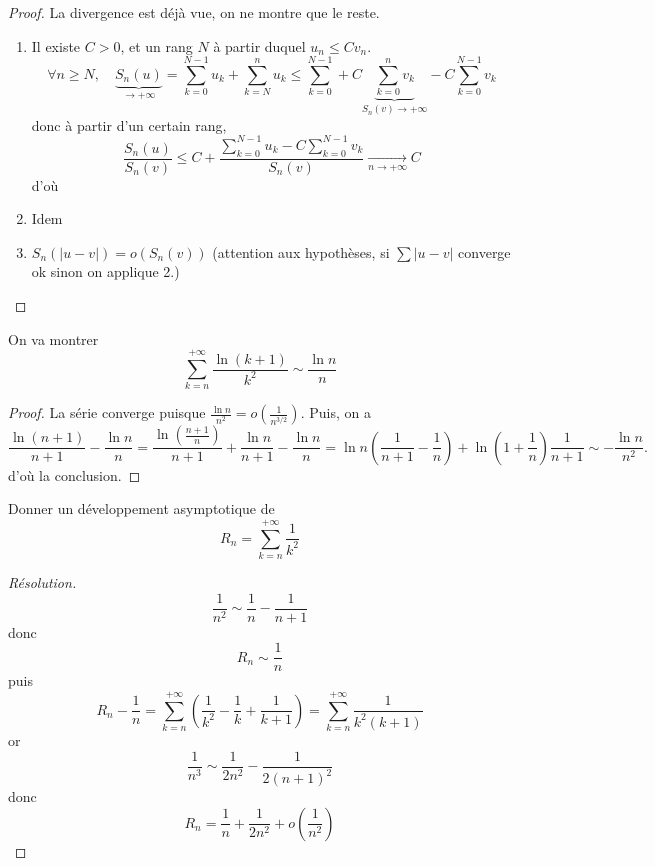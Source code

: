 \begin{proof}
    La divergence est déjà vue, on ne montre que le reste.
    \begin{enumerate}
        \item Il existe $C>0$, et un rang $N$ à partir duquel $u_n\leq Cv_n$. \[
                \forall n\geq N, \quad \underbrace{S_n(u)}_{\longrightarrow+\infty}=\sum_{k=0}^{N-1}u_k+\sum_{k=N}^nu_k\leq \sum_{k=0}^{N-1}+C\underbrace{\sum_{k=0}^nv_k}_{S_n(v)\longrightarrow+\infty}-C\sum_{k=0}^{N-1}v_k
            \]
            donc à partir d'un certain rang, \[
                \frac{S_n(u)}{S_n(v)}\leq C+\frac{\sum_{k=0}^{N-1}u_k-C\sum_{k=0}^{N-1}v_k}{S_n(v)}\xrightarrow[n\to+\infty]{}C
            \]
            d'où \conc
        \item Idem
        \item $S_n(|u-v|)=o(S_n(v))$ (attention aux hypothèses, si $\sum |u-v|$ converge ok sinon on applique 2.)
    \end{enumerate}
\end{proof}

\begin{ex}
    On va montrer \[
        \sum_{k=n}^{+\infty}\frac{\ln(k+1)}{k^2}\sim\frac{\ln n}n
    \]
\end{ex}

\begin{proof}
    La série converge puisque $\frac{\ln n}{n^2}=o \left( \frac1{n^{3/2}} \right)$. Puis,
    on a \[
        \frac{\ln(n+1)}{n+1}-\frac{\ln n}n=\frac{\ln \left( \frac{n+1}n \right)}{n+1}+\frac{\ln n}{n+1}-\frac{\ln n}n=\ln n \left( \frac1{n+1}-\frac1n \right)+\ln \left( 1+\frac1n \right)\frac1{n+1}\sim -\frac{\ln n}{n^2}.
    \]
    d'où la conclusion.
\end{proof}

\begin{exo}
    Donner un développement asymptotique de \[
        R_n=\sum_{k=n}^{+\infty}\frac1{k^2}
    \]
\end{exo}

\begin{proof}[Résolution]
    \[
        \frac1{n^2}\sim\frac1n-\frac1{n+1}
    \]
    donc \[
        R_n\sim \frac1n
    \]
    puis \[
        R_n-\frac1n=\sum_{k=n}^{+\infty} \left( \frac1{k^2}-\frac1k+\frac1{k+1} \right)=\sum_{k=n}^{+\infty}\frac1{k^2(k+1)}
    \]
    or \[
        \frac1{n^3}\sim \frac1{2n^2}-\frac1{2(n+1)^2}
    \]
    donc \[
        R_n=\frac1n+\frac1{2n^2}+o \left( \frac1{n^2} \right)
    \]
\end{proof}

